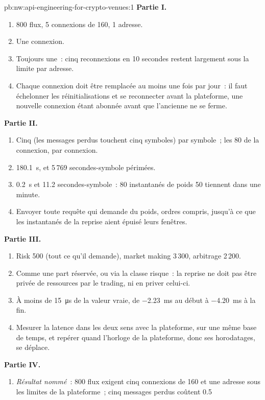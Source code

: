 \begin{solution}{pb:nw:api-engineering-for-crypto-venues:1}
\textbf{Partie I.}
\begin{enumerate}
\item 800 flux, 5 connexions de 160, 1 adresse.
\item Une connexion.
\item Toujours une~: cinq reconnexions en 10 secondes restent largement sous la limite par adresse.
\item Chaque connexion doit être remplacée au moins une fois par jour~: il faut échelonner les réinitialisations et se reconnecter avant la plateforme, une nouvelle connexion étant abonnée avant
  que l'ancienne ne se ferme.
\end{enumerate}
\textbf{Partie II.}
\begin{enumerate}[resume]
\item Cinq (les messages perdus touchent cinq symboles) par symbole~; les 80 de la connexion, par connexion.
\item \qty{180.1}{\second}, et 5\,769 secondes-symbole périmées.
\item \qty{0.2}{\second} et 11.2 secondes-symbole~: 80 instantanés de poids 50 tiennent dans une minute.
\item Envoyer toute requête qui demande du poids, ordres compris, jusqu'à ce que les instantanés de la reprise aient épuisé leurs fenêtres.
\end{enumerate}
\textbf{Partie III.}
\begin{enumerate}[resume]
\item Risk 500 (tout ce qu'il demande), market making 3\,300, arbitrage 2\,200.
\item Comme une part réservée, ou via la classe risque~: la reprise ne doit pas être privée de ressources par le trading, ni en priver celui-ci.
\item À moins de \qty{15}{\micro\second} de la valeur vraie, de \qty{-2.23}{\milli\second} au début à \qty{-4.20}{\milli\second} à la fin.
\item Mesurer la latence dans les deux sens avec la plateforme, sur une même base de temps, et repérer quand l'horloge de la plateforme, donc ses horodatages, se déplace.
\end{enumerate}
\textbf{Partie IV.}
\begin{enumerate}[resume]
\item \emph{Résultat nommé}~: 800 flux exigent cinq connexions de 160 et une adresse sous les limites de la plateforme~; cinq messages perdus coûtent 0.5

\end{enumerate}
\end{solution}
